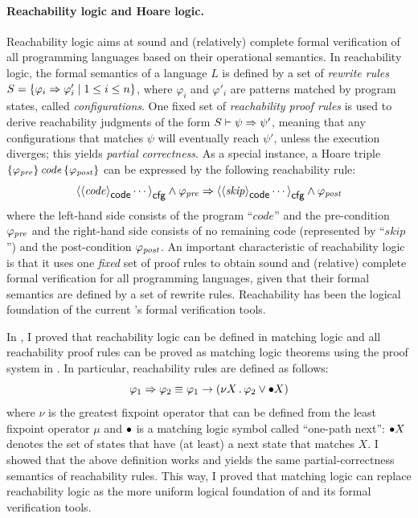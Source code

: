 \documentclass[11pt]{article}
\begin{document}
\paragraph{Reachability logic and Hoare logic.}

Reachability logic aims at sound and (relatively) 
complete formal verification of all programming languages based on their 
operational semantics. 
In reachability logic, the formal semantics of a language $L$
is defined by a set of \emph{rewrite rules} $S = \{ \varphi_i \To 
\varphi'_i \mid 1 \le i \le n\}$, where $\varphi_i$ and $\varphi'_i$ are 
patterns matched by program states, called \emph{configurations}. 
One fixed set of \emph{reachability proof rules} is used to  
derive reachability judgments of the form $S \vdash \psi \To \psi'$, meaning 
that any 
configurations that matches $\psi$ will eventually reach $\psi'$,
unless the execution diverges;
this yields \emph{partial correctness}.
As a special instance, a Hoare triple
$\{\varphipre\} \, \mathit{code} \, \{\varphipost\}$ can be expressed by the 
following reachability rule:
$$
\cell[cfg]{\cell[code]{\mathit{code}} \cdots} \land \varphipre
\To \cell[cfg]{\cell[code]{\mathit{skip}} \cdots} \land \varphipost
$$
where the left-hand side consists of the program ``$\mathit{code}$''
and the pre-condition $\varphipre$
and the right-hand side consists of no remaining code
(represented by ``$\mathit{skip}$'') and the post-condition $\varphipost$. 
An important characteristic of reachability logic is that it uses one 
\emph{fixed} set of proof rules to obtain sound and (relative) complete formal 
verification for all programming languages, given that their formal semantics 
are defined by a set of rewrite rules. 
Reachability has been the logical foundation of the current \K's formal 
verification tools.

In \cite{CR19}, I proved that reachability logic can be defined in matching 
logic and all reachability proof rules can be proved as matching logic theorems 
using the proof system in . 
In particular, reachability rules are defined as follows:
$$
\varphi_1 \To \varphi_2 \equiv \varphi_1 \imp 
\left(\nu X \ld \varphi_2 \vee \onenext X\right)
$$
where $\nu$ is the greatest fixpoint operator that can be defined from the 
least fixpoint operator $\mu$ and $\onenext$ is a matching logic symbol called 
``one-path next'': $\onenext X$ denotes the set of states that have (at least) 
a next state that matches $X$. 
I showed that the above definition works and yields the same 
partial-correctness semantics of reachability rules. 
This way, I proved that matching logic can replace reachability logic 
as the more uniform logical foundation of \K and its formal verification tools. 
\end{document}
